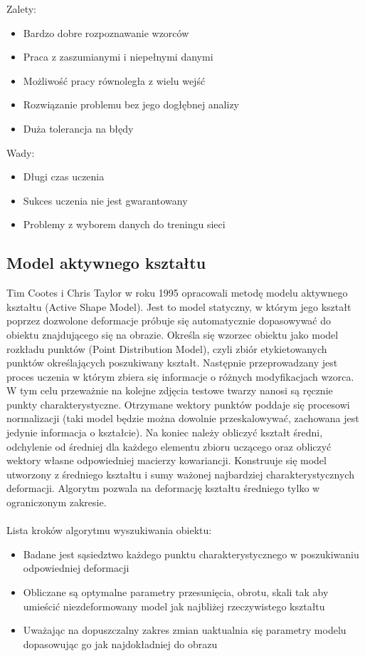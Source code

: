 \documentclass[11pt,a4paper]{article}
\begin{document}
\noindent 
Zalety:
\begin{itemize}
\item  Bardzo dobre rozpoznawanie wzorców
\item  Praca z zaszumianymi i niepełnymi danymi
\item  Możliwość pracy równoległa z wielu wejść
\item  Rozwiązanie problemu bez jego dogłębnej analizy
\item  Duża tolerancja na błędy
\end{itemize}

\noindent 
Wady:
\begin{itemize}
\item  Długi czas uczenia 
\item  Sukces uczenia nie jest gwarantowany 
\item  Problemy z wyborem danych do treningu sieci 
\end{itemize}

\subsection{Model aktywnego kształtu}
Tim Cootes i Chris Taylor w roku 1995 opracowali metodę modelu aktywnego kształtu (Active Shape Model). Jest to model statyczny, w którym jego kształt poprzez dozwolone deformacje próbuje się automatycznie dopasowywać do obiektu znajdującego się na obrazie. Określa się wzorzec obiektu jako model rozkładu punktów (Point Distribution Model), czyli zbiór etykietowanych punktów określających poszukiwany kształt. Następnie przeprowadzany jest proces uczenia w którym zbiera się informacje o różnych modyfikacjach wzorca. W tym celu przeważnie na kolejne zdjęcia testowe twarzy nanosi są ręcznie punkty charakterystyczne. Otrzymane wektory punktów poddaje się procesowi normalizacji (taki model będzie można dowolnie przeskalowywać, zachowana jest jedynie informacja o kształcie). Na koniec należy obliczyć kształt średni, odchylenie od średniej dla każdego elementu zbioru uczącego oraz obliczyć wektory własne odpowiedniej macierzy kowariancji. Konstruuje się model utworzony z średniego kształtu i sumy ważonej najbardziej charakterystycznych deformacji. Algorytm pozwala na deformację kształtu średniego tylko w ograniczonym zakresie.\\
\\
\noindent
Lista kroków algorytmu wyszukiwania obiektu:
\begin{itemize}
\item Badane jest sąsiedztwo każdego punktu charakterystycznego w poszukiwaniu odpowiedniej deformacji
\item Obliczane są optymalne parametry przesunięcia, obrotu, skali tak aby umieścić niezdeformowany model jak najbliżej rzeczywistego kształtu
\item Uważając na dopuszczalny zakres zmian uaktualnia się parametry modelu dopasowując go jak najdokładniej do obrazu
\end{itemize}
\end{document}
